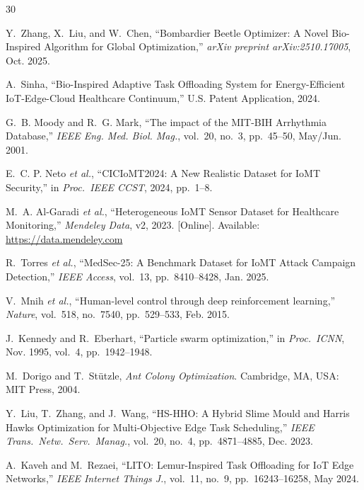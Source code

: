 \documentclass[journal]{IEEEtran}
\begin{document}
\begin{thebibliography}{30}

Y.~Zhang, X.~Liu, and W.~Chen,
``Bombardier Beetle Optimizer: A Novel Bio-Inspired Algorithm for
Global Optimization,''
\emph{arXiv preprint arXiv:2510.17005}, Oct. 2025.

A.~Sinha,
``Bio-Inspired Adaptive Task Offloading System for Energy-Efficient
IoT-Edge-Cloud Healthcare Continuum,''
U.S. Patent Application, 2024.

G.~B. Moody and R.~G. Mark,
``The impact of the MIT-BIH Arrhythmia Database,''
\emph{IEEE Eng. Med. Biol. Mag.}, vol.~20, no.~3, pp.~45--50,
May/Jun. 2001.

E.~C. P. Neto \emph{et al.},
``CICIoMT2024: A New Realistic Dataset for IoMT Security,''
in \emph{Proc.\ IEEE CCST}, 2024, pp.~1--8.

M.~A. Al-Garadi \emph{et al.},
``Heterogeneous IoMT Sensor Dataset for Healthcare Monitoring,''
\emph{Mendeley Data}, v2, 2023.
[Online]. Available: \url{https://data.mendeley.com}

R.~Torres \emph{et al.},
``MedSec-25: A Benchmark Dataset for IoMT Attack Campaign Detection,''
\emph{IEEE Access}, vol.~13, pp.~8410--8428, Jan. 2025.

V.~Mnih \emph{et al.},
``Human-level control through deep reinforcement learning,''
\emph{Nature}, vol.~518, no.~7540, pp.~529--533, Feb. 2015.

J.~Kennedy and R.~Eberhart,
``Particle swarm optimization,''
in \emph{Proc.\ ICNN}, Nov. 1995, vol.~4, pp.~1942--1948.

M.~Dorigo and T.~St{\"u}tzle,
\emph{Ant Colony Optimization}.
Cambridge, MA, USA: MIT Press, 2004.

Y.~Liu, T.~Zhang, and J.~Wang,
``HS-HHO: A Hybrid Slime Mould and Harris Hawks Optimization for
Multi-Objective Edge Task Scheduling,''
\emph{IEEE Trans.\ Netw.\ Serv.\ Manag.}, vol.~20, no.~4,
pp.~4871--4885, Dec. 2023.

A.~Kaveh and M.~Rezaei,
``LITO: Lemur-Inspired Task Offloading for IoT Edge Networks,''
\emph{IEEE Internet Things J.}, vol.~11, no.~9, pp.~16243--16258,
May 2024.


\end{thebibliography}
\end{document}
